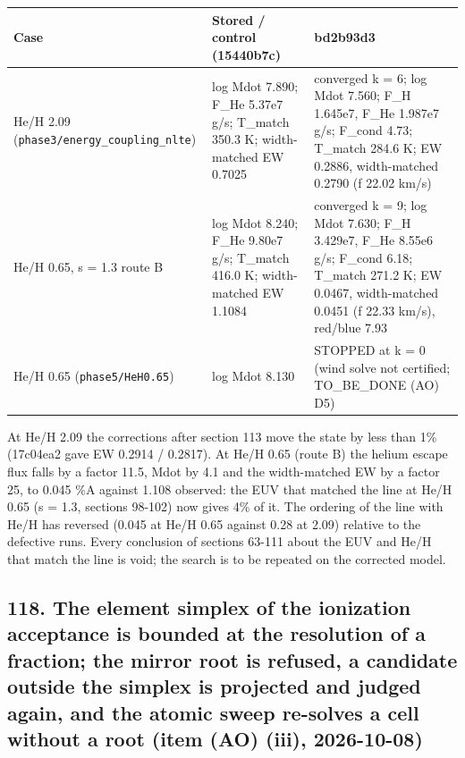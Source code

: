 \documentclass[english,a4paper]{my_memo}
\begin{document}
{\def\LTcaptype{none} %
{\small
\begin{longtable}[]{@{}lll@{}}
\toprule\noalign{}
Case & Stored / control (15440b7c) & bd2b93d3 \\
\midrule\noalign{}
\endhead
\bottomrule\noalign{}
\endlastfoot
He/H 2.09 (\texttt{phase3/energy\_coupling\_nlte}) & log Mdot 7.890; F\_He 5.37e7 g/s; T\_match 350.3 K; width-matched EW 0.7025 & converged k = 6; log Mdot 7.560; F\_H 1.645e7, F\_He 1.987e7 g/s; F\_cond 4.73; T\_match 284.6 K; EW 0.2886, width-matched 0.2790 (f 22.02 km/s) \\
He/H 0.65, s = 1.3 route B & log Mdot 8.240; F\_He 9.80e7 g/s; T\_match 416.0 K; width-matched EW 1.1084 & converged k = 9; log Mdot 7.630; F\_H 3.429e7, F\_He 8.55e6 g/s; F\_cond 6.18; T\_match 271.2 K; EW 0.0467, width-matched 0.0451 (f 22.33 km/s), red/blue 7.93 \\
He/H 0.65 (\texttt{phase5/HeH0.65}) & log Mdot 8.130 & STOPPED at k = 0 (wind solve not certified; TO\_BE\_DONE (AO) D5) \\
\end{longtable}
}
}

At He/H 2.09 the corrections after section 113 move the state by less than
1\% (17c04ea2 gave EW 0.2914 / 0.2817). At He/H 0.65 (route B) the helium
escape flux falls by a factor 11.5, Mdot by 4.1 and the width-matched EW by
a factor 25, to 0.045 \%A against 1.108 observed: the EUV that matched the
line at He/H 0.65 (s = 1.3, sections 98-102) now gives 4\% of it. The ordering
of the line with He/H has reversed (0.045 at He/H 0.65 against 0.28 at 2.09)
relative to the defective runs. Every conclusion of sections 63-111 about the
EUV and He/H that match the line is void; the search is to be repeated on
the corrected model.

\subsection{118. The element simplex of the ionization acceptance is bounded at the resolution of a fraction; the mirror root is refused, a candidate outside the simplex is projected and judged again, and the atomic sweep re-solves a cell without a root (item (AO) (iii), 2026-10-08)}\label{118-the-element-simplex-of-the-ionization-acceptance-is-bounded-at-the-resolution-of-a-fraction-the-mirror-root-is-refused-a-candidate-outside-the-simplex-is-projected-and-judged-again-and-the-atomic-sweep-re-solves-a-cell-without-a-root-item-ao-iii-2026-10-08}
\end{document}
